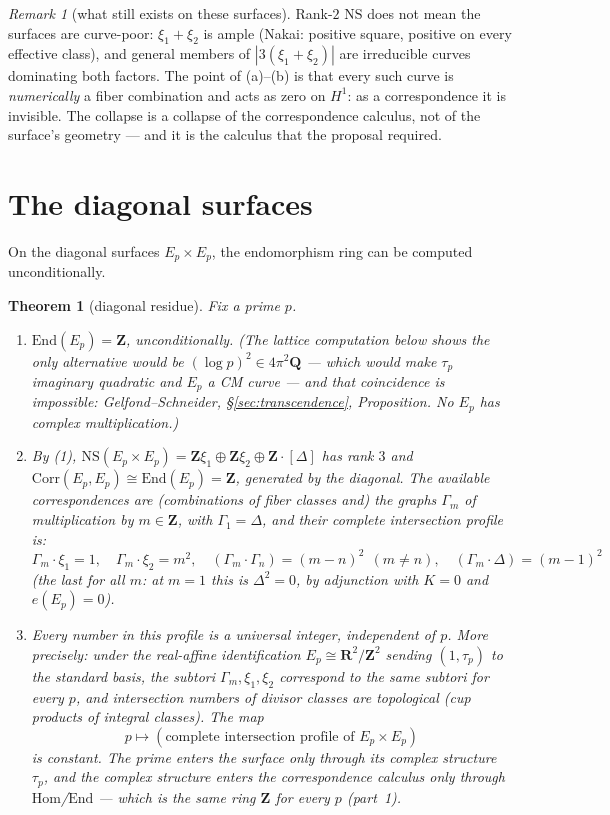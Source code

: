 \documentclass[11pt]{article}
\newtheorem{theorem}{Theorem}
\theoremstyle{definition}
\theoremstyle{remark}
\newtheorem{remark}{Remark}
\newcommand{\Z}{\mathbf{Z}}
\newcommand{\Q}{\mathbf{Q}}
\newcommand{\R}{\mathbf{R}}
\newcommand{\NS}{\mathrm{NS}}
\newcommand{\Hom}{\mathrm{Hom}}
\newcommand{\End}{\mathrm{End}}
\newcommand{\Corr}{\mathrm{Corr}}
\begin{document}
\begin{remark}[what still exists on these surfaces]
\label{rem:stillexists}
Rank-$2$ $\NS$ does not mean the surfaces are curve-poor: $\xi_1 + \xi_2$ is
ample (Nakai: positive square, positive on every effective class), and
general members of $|3(\xi_1+\xi_2)|$ are irreducible curves dominating both
factors. The point of (a)--(b) is that every such curve is \emph{numerically}
a fiber combination and acts as zero on $H^1$: as a correspondence it is
invisible. The collapse is a collapse of the correspondence calculus, not of
the surface's geometry --- and it is the calculus that the proposal required.
\end{remark}

\section{The diagonal surfaces}
\label{sec:diagonal}

On the diagonal surfaces $E_p\times E_p$, the endomorphism ring can be computed unconditionally.

\begin{theorem}[diagonal residue]
\label{thm:diagonal}
Fix a prime $p$.
\begin{enumerate}
\item $\End(E_p) = \Z$, unconditionally. (The lattice computation
below shows the only alternative would be $(\log p)^2 \in 4\pi^2\Q$ ---
which would make $\tau_p$ imaginary quadratic and $E_p$ a CM curve --- and
that coincidence is impossible: Gelfond--Schneider,
\S\ref{sec:transcendence}, Proposition. No $E_p$ has complex
multiplication.)
\item By (1), $\NS(E_p \times E_p) = \Z\xi_1 \oplus \Z\xi_2 \oplus \Z\cdot[\Delta]$
has rank $3$ and $\Corr(E_p, E_p) \cong \End(E_p) = \Z$, generated by the
diagonal. The available correspondences are (combinations of fiber classes
and) the graphs $\Gamma_m$ of multiplication by $m \in \Z$, with
$\Gamma_1 = \Delta$, and their complete intersection profile is:
\[
\Gamma_m\cdot\xi_1 = 1 , \quad
\Gamma_m\cdot\xi_2 = m^2 , \quad
(\Gamma_m\cdot\Gamma_n) = (m-n)^2 \ \ (m \neq n) , \quad
(\Gamma_m\cdot\Delta) = (m-1)^2
\]
(the last for all $m$: at $m = 1$ this is $\Delta^2 = 0$, by adjunction with
$K = 0$ and $e(E_p) = 0$).
\item Every number in this profile is a universal integer,
independent of $p$. More precisely: under the real-affine identification
$E_p \cong \R^2/\Z^2$ sending $(1, \tau_p)$ to the standard basis, the
subtori $\Gamma_m, \xi_1, \xi_2$ correspond to the \emph{same} subtori for
every $p$, and intersection numbers of divisor classes are topological (cup
products of integral classes). The map
\[
p \mapsto (\text{complete intersection profile of } E_p \times E_p)
\]
is constant. The prime enters the surface only through its complex structure
$\tau_p$, and the complex structure enters the correspondence calculus only
through $\Hom$/$\End$ --- which is the same ring $\Z$ for every $p$
(part~1).
\end{enumerate}
\end{theorem}
\end{document}
